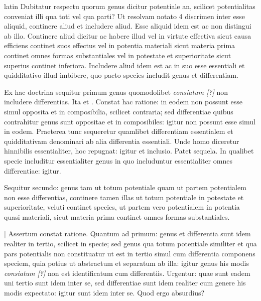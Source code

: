 \begin{otherlanguage*}{latin}
\pstart
 Dubitatur respectu quorum genus dicitur potentiale an, scilicet potentialitas conveniat illi qua toti vel qua parti? Ut resolvam notato 4 discrimen inter esse aliquid, continere aliud et includere aliud. Esse aliquid idem est ac non distingui ab illo. Continere aliud dicitur ac habere illud vel in virtute effectiva sicut causa efficiens continet suos effectus vel in potentia materiali sicut materia prima continet omnes formas substantiales vel in potestate et superioritate sicut superius continet inferiora. Includere aliud idem est ac in suo esse essentiali et quidditativo illud imbibere, quo pacto species includit genus et differentiam. 
\pend

\pstart
 Ex hac doctrina sequitur primum genus quomodolibet \emph{consiatum [?]} non includere differentias. Ita  et . Constat hac ratione: in eodem non possunt esse simul opposita et in composibilia, scilicet contraria; sed differentiae quibus contrahitur genus sunt oppositae et in composibiles: igitur non possunt esse simul in eodem. Praeterea tunc sequeretur quamlibet differentiam essentialem et quidditativam denominari ab alia differentia essentiali. Unde homo diceretur hinnibilis essentialiter, hoc repugnat: igitur et inclusio. Patet sequela. In qualibet specie includitur essentialiter genus in quo includuntur essentialiter omnes differentiae: igitur. 
\pend

\pstart
 Sequitur secundo: genus tam ut totum potentiale quam ut partem potentialem non esse differentias, continere tamen illas ut totum potentiale in potestate et superioritate, veluti continet species, ut partem vero potentialem in potentia quasi materiali, sicut materia prima continet omnes formas substantiales. 
\pend

\pstart
 \textnormal{|} Assertum constat ratione. Quantum ad primum: genus et differentia sunt idem realiter in tertio, scilicet in specie; sed genus qua totum potentiale similiter et qua pars potentialis non constituatur ut est in tertio simul cum differentia componens speciem, quia potius ut abstractum et separatum ab illa: igitur genus his modis \emph{consiatum [?]} non est identificatum cum differentiis. Urgentur: quae sunt eadem uni tertio sunt idem inter se, sed differentiae sunt idem realiter cum genere his modis expectato: igitur sunt idem inter se. Quod ergo absurdius? 
\pend


\end{otherlanguage*}
